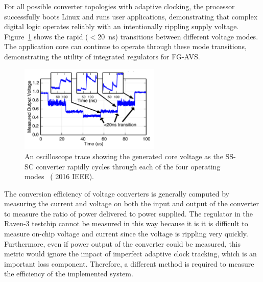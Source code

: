 \documentclass[graybox]{svmult}
\begin{document}
For all possible converter topologies with adaptive clocking, the processor successfully boots Linux and runs user applications, demonstrating that complex digital logic operates reliably with an intentionally rippling supply voltage.
Figure~\ref{fig:6-raven3-dcdc-modes} shows the rapid ($<$\SI{20}{\nano\second}) transitions between different voltage modes.
The application core can continue to operate through these mode transitions, demonstrating the utility of integrated regulators for FG-AVS.

\begin{figure}
  \centering
  \includegraphics[width=0.6\textwidth]{6-raven3-dcdc-modes}
  \caption{An oscilloscope trace showing the generated core voltage as the SS-SC converter rapidly cycles through each of the four operating modes~\cite{Zimmer2016} ({\textcopyright} 2016 IEEE).}
  \label{fig:6-raven3-dcdc-modes}
\end{figure}

The conversion efficiency of voltage converters is generally computed by measuring the current and voltage on both the input and output of the converter to measure the ratio of power delivered to power supplied.
The regulator in the Raven-3 testchip cannot be measured in this way because it is it is difficult to measure on-chip voltage and current since the voltage is rippling very quickly.
Furthermore, even if power output of the converter could be measured, this metric would ignore the impact of imperfect adaptive clock tracking, which is an important loss component.
Therefore, a different method is required to measure the efficiency of the implemented system.
\end{document}
